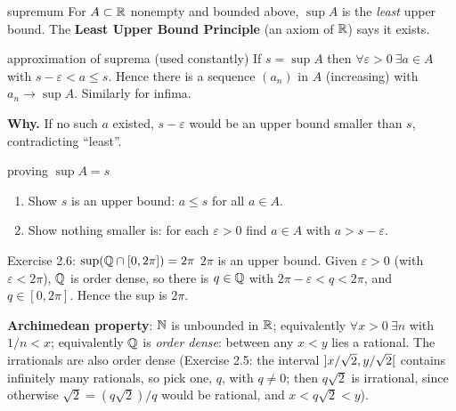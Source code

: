 \begin{defn}{supremum}
For $A\subset\mathbb R$ nonempty and bounded above, $\sup A$ is the \emph{least} upper bound. The
\textbf{Least Upper Bound Principle} (an axiom of $\mathbb R$) says it exists.
\end{defn}

\begin{thm}{approximation of suprema (used constantly)}
If $s=\sup A$ then $\forall\varepsilon>0\ \exists a\in A$ with $s-\varepsilon<a\le s$. Hence there is
a sequence $(a_n)$ in $A$ (increasing) with $a_n\to\sup A$. Similarly for infima.
\end{thm}
\begin{answer}
\textbf{Why.} If no such $a$ existed, $s-\varepsilon$ would be an upper bound smaller than $s$,
contradicting ``least''.
\end{answer}

\begin{steps}{proving $\sup A=s$}
\begin{enumerate}
\item Show $s$ is an upper bound: $a\le s$ for all $a\in A$.
\item Show nothing smaller is: for each $\varepsilon>0$ find $a\in A$ with $a>s-\varepsilon$.
\end{enumerate}
\end{steps}

\begin{example}{Exercise 2.6: $\sup(\mathbb Q\cap[0,2\pi])=2\pi$}
$2\pi$ is an upper bound. Given $\varepsilon>0$ (with $\varepsilon<2\pi$), $\mathbb Q$ is order dense, so
there is $q\in\mathbb Q$ with $2\pi-\varepsilon<q<2\pi$, and $q\in[0,2\pi]$. Hence the sup is $2\pi$.
\end{example}

\textbf{Archimedean property}: $\mathbb N$ is unbounded in $\mathbb R$; equivalently
$\forall x>0\ \exists n$ with $1/n<x$; equivalently $\mathbb Q$ is \emph{order dense}: between any
$x<y$ lies a rational. The irrationals are also order dense (Exercise 2.5: the interval $\mathopen{]}x/\sqrt2,y/\sqrt2\mathclose{[}$ contains infinitely many rationals,
so pick one, $q$, with $q\ne0$; then $q\sqrt2$ is irrational, since otherwise
$\sqrt2=(q\sqrt2)/q$ would be rational, and $x<q\sqrt2<y$).

